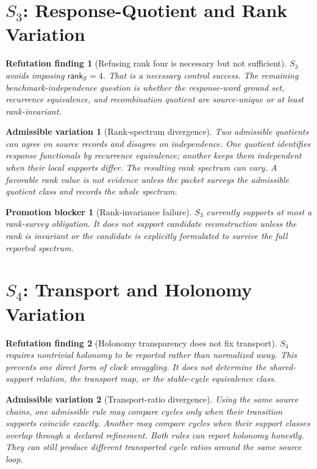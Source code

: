 \documentclass[11pt]{article}
\newcommand{\Rank}{\mathsf{rank}_{\mathcal{S}}}
\newtheorem{finding}{Refutation finding}
\newtheorem{variation}{Admissible variation}
\newtheorem{blocker}{Promotion blocker}
\begin{document}
\section{\texorpdfstring{\(S_3\)}{S3}: Response-Quotient and Rank Variation}

\begin{finding}[Refusing rank four is necessary but not sufficient]
\(S_3\) avoids imposing \(\Rank=4\). That is a necessary control success. The
remaining benchmark-independence question is whether the response-word ground
set, recurrence equivalence, and recombination quotient are source-unique or
at least rank-invariant.
\end{finding}

\begin{variation}[Rank-spectrum divergence]
Two admissible quotients can agree on source records and disagree on
independence. One quotient identifies response functionals by recurrence
equivalence; another keeps them independent when their local supports differ.
The resulting rank spectrum can vary. A favorable rank value is not evidence
unless the packet surveys the admissible quotient class and records the whole
spectrum.
\end{variation}

\begin{blocker}[Rank-invariance failure]
\(S_3\) currently supports at most a rank-survey obligation. It does not
support candidate reconstruction unless the rank is invariant or the
candidate is explicitly formulated to survive the full reported spectrum.
\end{blocker}

\section{\texorpdfstring{\(S_4\)}{S4}: Transport and Holonomy Variation}

\begin{finding}[Holonomy transparency does not fix transport]
\(S_4\) requires nontrivial holonomy to be reported rather than normalized
away. This prevents one direct form of clock smuggling. It does not determine
the shared-support relation, the transport map, or the stable-cycle
equivalence class.
\end{finding}

\begin{variation}[Transport-ratio divergence]
Using the same source chains, one admissible rule may compare cycles only
when their transition supports coincide exactly. Another may compare cycles
when their support classes overlap through a declared refinement. Both rules
can report holonomy honestly. They can still produce different transported
cycle ratios around the same source loop.
\end{variation}
\end{document}
